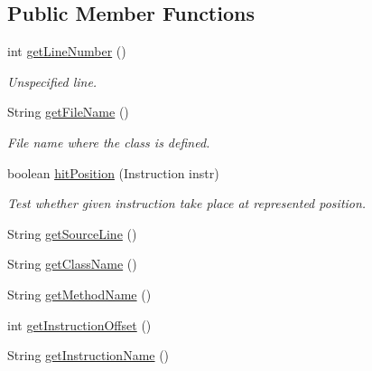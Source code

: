 \subsection*{Public Member Functions}
\begin{DoxyCompactItemize}
\item 
int \hyperlink{interfacegov_1_1nasa_1_1jpf_1_1inspector_1_1interfaces_1_1_instruction_position_ac5cae68ff61d71dbf7b90e30b8291784}{get\+Line\+Number} ()
\begin{DoxyCompactList}\small\item\em Unspecified line. \end{DoxyCompactList}\item 
String \hyperlink{interfacegov_1_1nasa_1_1jpf_1_1inspector_1_1interfaces_1_1_instruction_position_ac1fb787ee623734fb5be1266d14727ce}{get\+File\+Name} ()
\begin{DoxyCompactList}\small\item\em File name where the class is defined. \end{DoxyCompactList}\item 
boolean \hyperlink{interfacegov_1_1nasa_1_1jpf_1_1inspector_1_1interfaces_1_1_instruction_position_a74e0a143b5cc51a5b147f2f2a2709638}{hit\+Position} (Instruction instr)
\begin{DoxyCompactList}\small\item\em Test whether given instruction take place at represented position. \end{DoxyCompactList}\item 
String \hyperlink{interfacegov_1_1nasa_1_1jpf_1_1inspector_1_1interfaces_1_1_instruction_position_a0342e29e0494c702ad280347bfb10b61}{get\+Source\+Line} ()
\item 
String \hyperlink{interfacegov_1_1nasa_1_1jpf_1_1inspector_1_1interfaces_1_1_instruction_position_a1a109a1b9cac93e4d189ef5498863fce}{get\+Class\+Name} ()
\item 
String \hyperlink{interfacegov_1_1nasa_1_1jpf_1_1inspector_1_1interfaces_1_1_instruction_position_af77fc9b5ef58775d31d36b20d68598d9}{get\+Method\+Name} ()
\item 
int \hyperlink{interfacegov_1_1nasa_1_1jpf_1_1inspector_1_1interfaces_1_1_instruction_position_aa427266d185784b5dd204c7f31b4ff54}{get\+Instruction\+Offset} ()
\item 
String \hyperlink{interfacegov_1_1nasa_1_1jpf_1_1inspector_1_1interfaces_1_1_instruction_position_a70c3855595601858a5d63e30db44a63d}{get\+Instruction\+Name} ()
\end{DoxyCompactItemize}
